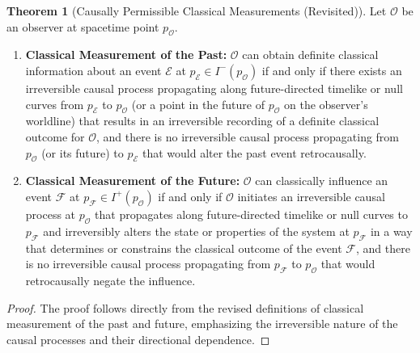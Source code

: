 \documentclass{article}
\theoremstyle{definition}
\newtheorem{theorem}[definition]{Theorem}
\begin{document}
	\begin{theorem}[Causally Permissible Classical Measurements (Revisited)]
		Let $\mathcal{O}$ be an observer at spacetime point $p_{\mathcal{O}}$.
		
		\begin{enumerate}
			\item \textbf{Classical Measurement of the Past:} $\mathcal{O}$ can obtain definite classical information about an event $\mathcal{E}$ at $p_{\mathcal{E}} \in I^-(p_{\mathcal{O}})$ if and only if there exists an irreversible causal process propagating along future-directed timelike or null curves from $p_{\mathcal{E}}$ to $p_{\mathcal{O}}$ (or a point in the future of $p_{\mathcal{O}}$ on the observer's worldline) that results in an irreversible recording of a definite classical outcome for $\mathcal{O}$, and there is no irreversible causal process propagating from $p_{\mathcal{O}}$ (or its future) to $p_{\mathcal{E}}$ that would alter the past event retrocausally.
			
			\item \textbf{Classical Measurement of the Future:} $\mathcal{O}$ can classically influence an event $\mathcal{F}$ at $p_{\mathcal{F}} \in I^+(p_{\mathcal{O}})$ if and only if $\mathcal{O}$ initiates an irreversible causal process at $p_{\mathcal{O}}$ that propagates along future-directed timelike or null curves to $p_{\mathcal{F}}$ and irreversibly alters the state or properties of the system at $p_{\mathcal{F}}$ in a way that determines or constrains the classical outcome of the event $\mathcal{F}$, and there is no irreversible causal process propagating from $p_{\mathcal{F}}$ to $p_{\mathcal{O}}$ that would retrocausally negate the influence.
		\end{enumerate}
		\begin{proof}
			The proof follows directly from the revised definitions of classical measurement of the past and future, emphasizing the irreversible nature of the causal processes and their directional dependence.
		\end{proof}
	\end{theorem}
	
\end{document}
